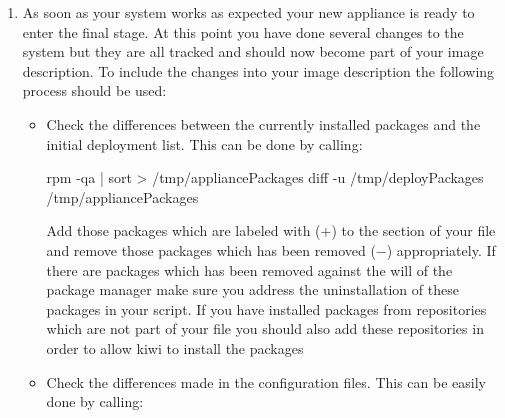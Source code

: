 \begin{enumerate}
\begin{itemize}
\begin{Command}{10cm}
rpm -qa | sort > /tmp/deployPackages
\end{Command}

      \item Check the output of the command  and
            include everything which is unknown to git and surely
            will not be changed by you and will not become part of the
            image description overlay files to the 
            files
      \end{itemize}

      After the initial package list exists and the git repository is
      clean you can start to configure the system. You never should
      install additional software just by installing an unmanaged archive
      or build and install from source. It's very hard to find out
      what binary files had been installed and it's also not architecture
      safe. If there is really no other way for the software to become
      part of the image you should address this issue directly in your
      image description and the config.sh script but not after the initial
      deployment has happened.
\item As soon as your system works as expected your new appliance is
      ready to enter the final stage. At this point you have done several
      changes to the system but they are all tracked and should now become
      part of your image description. To include the changes into your
      image description the following process should be used:
      \begin{itemize}
      \item Check the differences between the currently installed packages
            and the initial deployment list. This can be done by calling:

\begin{Command}{12cm}
rpm -qa | sort > /tmp/appliancePackages
diff -u /tmp/deployPackages /tmp/appliancePackages
\end{Command}

            Add those packages which are labeled with ($+$) to the
             section of your 
            file and remove those packages which has been removed ($-$)
            appropriately. If there are packages which has been removed
            against the will of the package manager make sure you address
            the uninstallation of these packages in your 
            script. If you have installed packages from repositories which
            are not part of your  file you should also add these
            repositories in order to allow kiwi to install the packages
      \item Check the differences made in the configuration files. This
            can be easily done by calling:


\end{itemize}
\end{enumerate}
